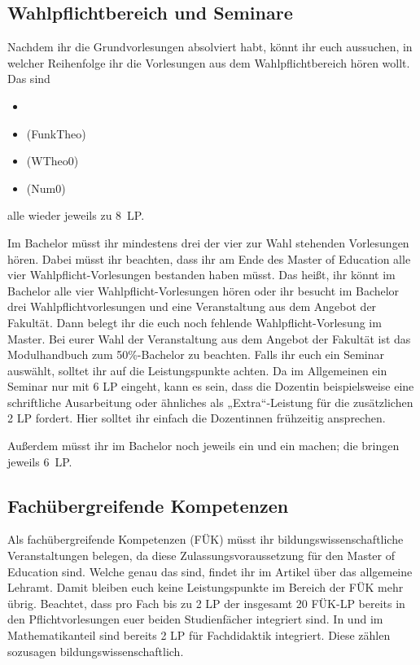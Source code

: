 \subsection{Wahlpflichtbereich und Seminare}

Nachdem ihr die Grundvorlesungen absolviert habt, könnt ihr euch aussuchen, in welcher Reihenfolge ihr die Vorlesungen aus dem Wahlpflichtbereich hören wollt. Das sind
\begin{itemize}
  \item {}
  \item {} (\gls{FunkTheo})
  \item {} (\gls{WTheo0})
  \item {} (\gls{Num0})
\end{itemize}
alle wieder jeweils zu 8~\gls{LP}. 

Im Bachelor müsst ihr mindestens drei der vier zur Wahl stehenden Vorlesungen hören. Dabei müsst ihr beachten, dass ihr am Ende des Master of Education alle vier Wahlpflicht-Vorlesungen bestanden haben müsst. Das heißt, ihr könnt im Bachelor alle vier Wahlpflicht-Vorlesungen hören oder ihr besucht im Bachelor drei Wahlpflichtvorlesungen und eine Veranstaltung aus dem Angebot der Fakultät. Dann belegt ihr die euch noch fehlende Wahlpflicht-Vorlesung im Master. Bei eurer Wahl der Veranstaltung aus dem Angebot der Fakultät ist das Modulhandbuch zum 50\%-Bachelor zu beachten. Falls ihr euch ein Seminar auswählt, solltet ihr auf die Leistungspunkte achten. Da im Allgemeinen ein Seminar nur mit 6 \gls{LP} eingeht, kann es sein, dass die Dozentin beispielsweise eine schriftliche Ausarbeitung oder ähnliches als „Extra“-Leistung für die zusätzlichen 2 \gls{LP} fordert. Hier solltet ihr einfach die Dozentinnen frühzeitig ansprechen.

Außerdem müsst ihr im Bachelor noch jeweils ein  und ein  machen; die bringen jeweils 6~\gls{LP}.

\subsection{Fachübergreifende Kompetenzen}

Als fachübergreifende Kompetenzen (FÜK) müsst ihr bildungswissenschaftliche Veranstaltungen belegen, da diese Zulassungsvoraussetzung für den Master of Education sind. Welche genau das sind, findet ihr im Artikel über das allgemeine Lehramt. Damit bleiben euch keine Leistungspunkte im Bereich der FÜK mehr übrig. Beachtet, dass pro Fach bis zu 2 \gls{LP} der insgesamt 20 FÜK-\gls{LP} bereits in den Pflichtvorlesungen euer beiden Studienfächer integriert sind. In  und  im Mathematikanteil sind bereits 2 \gls{LP} für Fachdidaktik integriert. Diese zählen sozusagen bildungswissenschaftlich.

